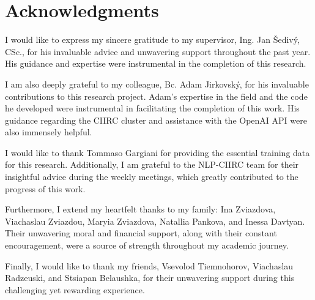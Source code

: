 
\section*{Acknowledgments}

I would like to express my sincere gratitude to my supervisor, Ing. Jan Šedivý, CSc., for his invaluable advice and unwavering support throughout the past year.
His guidance and expertise were instrumental in the completion of this research.

I am also deeply grateful to my colleague, Bc. Adam Jirkovský, for his invaluable contributions to this research project.
Adam's expertise in the field and the code he developed were instrumental in facilitating the completion of this work.
His guidance regarding the CIIRC cluster and assistance with the OpenAI API were also immensely helpful.

I would like to thank Tommaso Gargiani for providing the essential training data for this research.
Additionally, I am grateful to the NLP-CIIRC team for their insightful advice during the weekly meetings, which greatly contributed to the progress of this work.

Furthermore, I extend my heartfelt thanks to my family: Ina Zviazdova, Viachaslau Zviazdou, Maryia Zviazdova, Natallia Pankova, and Inessa Davtyan.
Their unwavering moral and financial support, along with their constant encouragement, were a source of strength throughout my academic journey.

Finally, I would like to thank my friends, Vsevolod Tiemnohorov, Viachaslau Radzeuski, and Stsiapan Belaushka, for their unwavering support during this challenging yet rewarding experience.

\vspace{2.5cm}
